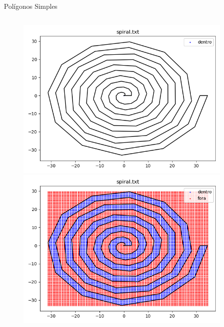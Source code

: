 \documentclass[aspectratio=169,usenames,dvipsnames]{beamer}
\begin{document}
\begin{frame}{Polígonos Simples}
  \begin{columns}
    \begin{center}
      \begin{figure}
        \begin{overprint}
        \includegraphics[width=1.0\textwidth]{figures/spiral.png}
        \includegraphics[width=1.0\textwidth]{figures/spiral_grid.png}
        \end{overprint}
      \end{figure}
    \end{center}
    \begin{center}

\end{center}
\end{columns}
\end{frame}
\end{document}
